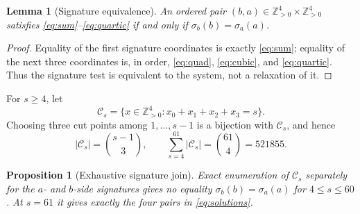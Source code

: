 \documentclass[11pt]{article}
\newtheorem{lemma}[theorem]{Lemma}
\newtheorem{proposition}[theorem]{Proposition}
\newcommand{\Zpos}{\mathbb Z_{>0}}
\begin{document}
\begin{lemma}[Signature equivalence]\label{lem:signature}
An ordered pair $(b,a)\in\Zpos^4\times\Zpos^4$ satisfies
\eqref{eq:sum}--\eqref{eq:quartic} if and only if
$\sigma_b(b)=\sigma_a(a)$.
\end{lemma}

\begin{proof}
Equality of the first signature coordinates is exactly \eqref{eq:sum};
equality of the next three coordinates is, in order,
\eqref{eq:quad}, \eqref{eq:cubic}, and \eqref{eq:quartic}.  Thus the
signature test is equivalent to the system, not a relaxation of it.
\end{proof}

For $s\geq4$, let
\[
 \mathcal C_s=\{x\in\Zpos^4:x_0+x_1+x_2+x_3=s\}.
\]
Choosing three cut points among $1,\ldots,s-1$ is a bijection with
$\mathcal C_s$, and hence
\begin{equation}\label{eq:counts}
 |\mathcal C_s|=\binom{s-1}{3},\qquad
 \sum_{s=4}^{61}|\mathcal C_s|=\binom{61}{4}=521855.
\end{equation}

\begin{proposition}[Exhaustive signature join]\label{prop:join}
Exact enumeration of $\mathcal C_s$ separately for the $a$- and $b$-side
signatures gives no equality $\sigma_b(b)=\sigma_a(a)$ for
$4\leq s\leq60$.  At $s=61$ it gives exactly the four pairs in
\eqref{eq:solutions}.
\end{proposition}
\end{document}
